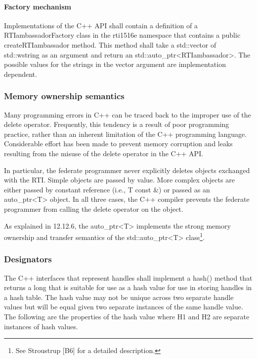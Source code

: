 \begin{compactstdpage}
    \paragraph{Factory mechanism}

    Implementations of the C++ API shall contain a definition of a RTIambassadorFactory class in the rti1516e namespace that contains a public createRTIambassador method. This method shall take a std::vector of std::wstring as an argument and return an std::auto\_ptr\textless{}RTIambassador\textgreater{}. The possible values for the strings in the vector argument are implementation dependent.

    \subsubsection{Memory ownership semantics}

    Many programming errors in C++ can be traced back to the improper use of the delete operator. Frequently, this tendency is a result of poor programming practice, rather than an inherent limitation of the C++ programming language. Considerable effort has been made to prevent memory corruption and leaks resulting from the misuse of the delete operator in the C++ API.

    In particular, the federate programmer never explicitly deletes objects exchanged with the RTI. Simple objects are passed by value. More complex objects are either passed by constant reference (i.e., T const \&) or passed as an auto\_ptr\textless{}T\textgreater{} object. In all three cases, the C++ compiler prevents the federate programmer from calling the delete operator on the object.

    As explained in 12.12.6, the auto\_ptr\textless{}T\textgreater{} implements the strong memory ownership and transfer semantics of the std::auto\_ptr\textless{}T\textgreater{} class\footnote{See Stroustrup [B6] for a detailed description.}.

    \subsubsection{Designators}

    The C++ interfaces that represent handles shall implement a hash() method that returns a long that is suitable for use as a hash value for use in storing handles in a hash table. The hash value may not be unique across two separate handle values but will be equal given two separate instances of the same handle value. The following are the properties of the hash value where H1 and H2 are separate instances of hash values.


\end{compactstdpage}
